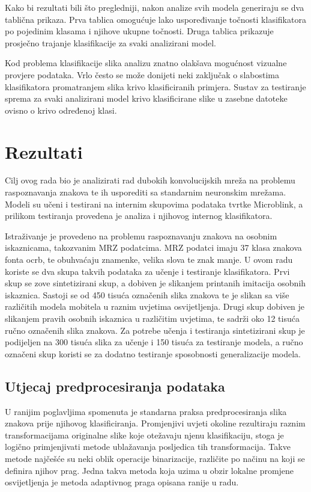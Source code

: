 \documentclass[lmodern, utf8, diplomski, numeric]{fer}
\begin{document}
Kako bi rezultati bili što pregledniji, nakon analize svih modela generiraju se dva tablična prikaza. Prva tablica omogućuje lako uspoređivanje točnosti klasifikatora po pojedinim klasama i njihove ukupne točnosti. Druga tablica prikazuje prosječno trajanje klasifikacije za svaki analizirani model. 

Kod problema klasifikacije slika analizu znatno olakšava mogućnost vizualne provjere podataka. Vrlo često se može donijeti neki zaključak o slabostima klasifikatora promatranjem slika krivo klasificiranih primjera. Sustav za testiranje sprema za svaki analizirani model krivo klasificirane slike u zasebne datoteke ovisno o krivo određenoj klasi.






\chapter{Rezultati}

Cilj ovog rada bio je analizirati rad dubokih konvolucijskih mreža na problemu raspoznavanja znakova te ih usporediti sa standarnim neuronskim mrežama. Modeli su učeni i testirani na internim skupovima podataka tvrtke Microblink, a prilikom testiranja provedena je analiza i njihovog internog klasifikatora. 

Istraživanje je provedeno na problemu raspoznavanju znakova na osobnim iskaznicama, takozvanim MRZ podatcima. MRZ podatci imaju 37 klasa znakova fonta ocrb, te obuhvaćaju znamenke, velika slova te znak manje. U ovom radu koriste se dva skupa takvih podataka za učenje i testiranje klasifikatora. Prvi skup se zove sintetizirani skup, a dobiven je slikanjem printanih imitacija osobnih iskaznica. Sastoji se od 450 tisuća označenih slika znakova te je slikan sa više različitih modela mobitela u raznim uvjetima osvijetljenja. Drugi skup dobiven je slikanjem pravih osobnih iskaznica u različitim uvjetima, te sadrži oko 12 tisuća ručno označenih slika znakova. Za potrebe učenja i testiranja sintetizirani skup je podijeljen na 300 tisuća slika za učenje i 150 tisuća za testiranje modela, a ručno označeni skup koristi se za dodatno testiranje sposobnosti generalizacije modela.



\section{Utjecaj predprocesiranja podataka}


U ranijim poglavljima spomenuta je standarna praksa predprocesiranja slika znakova prije njihovog klasificiranja. Promjenjivi uvjeti okoline rezultiraju raznim transformacijama originalne slike koje otežavaju njenu klasifikaciju, stoga je logično primjenjivati metode ublažavanja posljedica tih transformacija. Takve metode najčešće su neki oblik operacije binarizacije, različite po načinu na koji se definira njihov prag. Jedna takva metoda koja uzima u obzir lokalne promjene osvijetljenja je metoda adaptivnog praga opisana ranije u radu.
\end{document}
